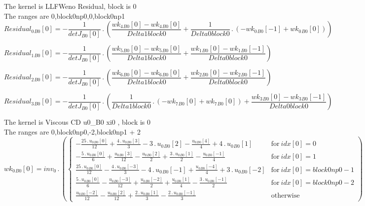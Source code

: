 \documentclass{article}
\begin{document}
\noindent The kernel is LLFWeno Residual, block is 0\\\noindent The ranges are 0,block0np0,0,block0np1\\\begin{dmath}{Residual_{0}{_{B0}}}[{0}] = - \frac{1}{{detJ{_{B0}}}[{0}]} \,.\, \left(\frac{{wk_{4}{_{B0}}}[{0}] - {wk_{4}{_{B0}}}[{0}]}{Delta1block0} + \frac{1}{Delta0block0} \,.\, \left(- {wk_{0}{_{B0}}}[{-1}] + 
{wk_{0}{_{B0}}}[{0}]\right)\right)\end{dmath}

\begin{dmath}{Residual_{1}{_{B0}}}[{0}] = - \frac{1}{{detJ{_{B0}}}[{0}]} \,.\, \left(\frac{{wk_{5}{_{B0}}}[{0}] - {wk_{5}{_{B0}}}[{0}]}{Delta1block0} + \frac{{wk_{1}{_{B0}}}[{0}] - {wk_{1}{_{B0}}}[{-1}]}{Delta0block0}\right)\end{dmath}

\begin{dmath}{Residual_{2}{_{B0}}}[{0}] = - \frac{1}{{detJ{_{B0}}}[{0}]} \,.\, \left(\frac{{wk_{6}{_{B0}}}[{0}] - {wk_{6}{_{B0}}}[{0}]}{Delta1block0} + \frac{{wk_{2}{_{B0}}}[{0}] - {wk_{2}{_{B0}}}[{-1}]}{Delta0block0}\right)\end{dmath}

\begin{dmath}{Residual_{3}{_{B0}}}[{0}] = - \frac{1}{{detJ{_{B0}}}[{0}]} \,.\, \left(\frac{1}{Delta1block0} \,.\, \left(- {wk_{7}{_{B0}}}[{0}] + {wk_{7}{_{B0}}}[{0}]\right) + \frac{{wk_{3}{_{B0}}}[{0}] - 
{wk_{3}{_{B0}}}[{-1}]}{Delta0block0}\right)\end{dmath}

\noindent The kernel is Viscous CD u0_B0 xi0 , block is 0\\\noindent The ranges are 0,block0np0,-2,block0np1 + 2\\\begin{dmath}{wk_{0}{_{B0}}}[{0}] = inv_0 \,.\, \left(\begin{cases} - \frac{25 \,.\, {u_{0}{_{B0}}}[{0}]}{12} + \frac{4 \,.\, {u_{0}{_{B0}}}[{3}]}{3} - 3 \,.\, {u_{0}{_{B0}}}[{2}] - \frac{{u_{0}{_{B0}}}[{4}]}{4} + 4 \,.\, {u_{0}{_{B0}}}[{1}] & 
\text{for}\: {idx}[{0}] = 0 \\- \frac{5 \,.\, {u_{0}{_{B0}}}[{0}]}{6} + \frac{{u_{0}{_{B0}}}[{3}]}{12} - \frac{{u_{0}{_{B0}}}[{2}]}{2} + \frac{3 \,.\, {u_{0}{_{B0}}}[{1}]}{2} - \frac{{u_{0}{_{B0}}}[{-1}]}{4} & \text{for}\: {idx}[{0}] = 1 \\\frac{25 
\,.\, {u_{0}{_{B0}}}[{0}]}{12} - \frac{4 \,.\, {u_{0}{_{B0}}}[{-3}]}{3} - 4 \,.\, {u_{0}{_{B0}}}[{-1}] + \frac{{u_{0}{_{B0}}}[{-4}]}{4} + 3 \,.\, {u_{0}{_{B0}}}[{-2}] & \text{for}\: {idx}[{0}] = block0np0 - 1 \\\frac{5 \,.\, {u_{0}{_{B0}}}[{0}]}{6} - 
\frac{{u_{0}{_{B0}}}[{-3}]}{12} + \frac{{u_{0}{_{B0}}}[{-2}]}{2} + \frac{{u_{0}{_{B0}}}[{1}]}{4} - \frac{3 \,.\, {u_{0}{_{B0}}}[{-1}]}{2} & \text{for}\: {idx}[{0}] = block0np0 - 2 \\\frac{{u_{0}{_{B0}}}[{-2}]}{12} - \frac{{u_{0}{_{B0}}}[{2}]}{12} + 
\frac{2 \,.\, {u_{0}{_{B0}}}[{1}]}{3} - \frac{2 \,.\, {u_{0}{_{B0}}}[{-1}]}{3} & \text{otherwise} \end{cases}\right)\end{dmath}
\end{document}
